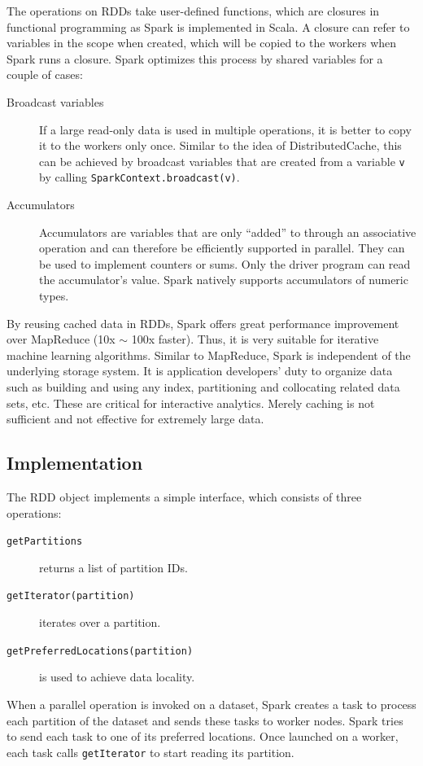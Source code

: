 \documentclass[11pt]{book}
\begin{document}
The operations on RDDs take user-defined functions, which are closures in functional programming as Spark is implemented in Scala. A closure can refer to variables in the scope when created, which will be copied to the workers when Spark runs a closure. Spark optimizes this process by shared variables for a couple of cases:
\begin{description}
\item[Broadcast variables]
If a large read-only data is used in multiple operations, it is better to copy it to the workers only once. Similar to the idea of DistributedCache, this can be achieved by broadcast variables that are created from a variable \texttt{v} by calling \texttt{SparkContext.broadcast(v)}.
\item[Accumulators]
Accumulators are variables that are only ``added'' to through an associative operation and can therefore be efficiently supported in parallel. They can be used to implement counters or sums. Only the driver program can read the accumulator's value. Spark natively supports accumulators of numeric types.
\end{description}
By reusing cached data in RDDs, Spark offers great performance improvement over MapReduce (10x $\sim$ 100x faster). Thus, it is very suitable for iterative machine learning algorithms.
Similar to MapReduce, Spark is independent of the underlying storage system. It is application developers' duty to organize data such as building and using any index, partitioning and collocating related data sets, etc. These are critical for interactive analytics. Merely caching is not sufficient and not effective for extremely large data.

\subsection{Implementation}
The RDD object implements a simple interface, which consists of three operations:
\begin{description}
\item[\texttt{getPartitions}] returns a list of partition IDs.
\item[\texttt{getIterator(partition)}] iterates over a partition.
\item[\texttt{getPreferredLocations(partition)}] is used to achieve data locality.
\end{description}
When a parallel operation is invoked on a dataset, Spark creates a task to process each partition of the dataset and sends these tasks to worker nodes. Spark tries to send each task to one of its preferred locations. Once launched on a worker, each task calls \texttt{getIterator} to start reading its partition.
\end{document}
